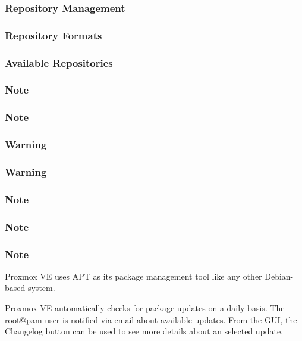 \subsubsection{Repository Management}

\subsubsection{Repository Formats}

\subsubsection{Available Repositories}

\subsubsection{Note}

\subsubsection{Note}

\subsubsection{Warning}

\subsubsection{Warning}

\subsubsection{Note}

\subsubsection{Note}

\subsubsection{Note}

Proxmox VE uses APT as its package management tool like any other Debian-based system.

Proxmox VE automatically checks for package updates on a daily basis. The root@pam user is notified via email about available updates. From the GUI, the Changelog button can be used to see more details about an selected update.

